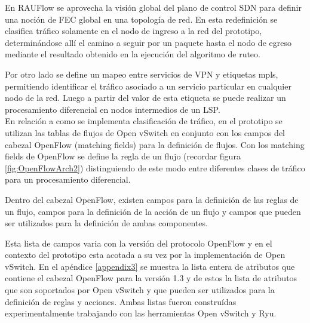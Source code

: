 En RAUFlow se aprovecha la visi\'on global del plano de control SDN para definir una noci\'on de FEC global en una topolog\'ia de red. En esta redefinici\'on se clasifica tr\'afico solamente en el nodo de ingreso a la red del prototipo, determinándose all\'i el camino a seguir por un paquete hasta el nodo de egreso mediante el resultado obtenido en la ejecuci\'on del algoritmo de ruteo. 


Por otro lado se define un mapeo entre servicios de VPN y etiquetas mpls, permitiendo identificar el tr\'afico asociado a un servicio particular en cualquier nodo de la red. Luego a partir del valor de esta etiqueta se puede realizar un procesamiento diferencial en nodos intermedios de un LSP.\\


En relaci\'on a como se implementa clasificaci\'on de tr\'afico, en el prototipo se utilizan las tablas de flujos de Open vSwitch en conjunto con los campos del cabezal OpenFlow (matching fields) para la definici\'on de flujos. Con los matching fields de OpenFlow se define la regla de un flujo (recordar figura \ref{fig:OpenFlowArch2}) distinguiendo de este modo entre diferentes clases de tr\'afico para un procesamiento diferencial.

Dentro del cabezal OpenFlow, existen campos para la definici\'on de las reglas de un flujo, campos para la definici\'on de la acci\'on de un flujo y campos que pueden ser utilizados para la definici\'on de ambas componentes.  

Esta lista de campos varia con la versi\'on del protocolo OpenFlow y en el contexto del prototipo esta acotada a su vez por la implementaci\'on de Open vSwitch. En el ap\'endice \ref{appendix3} se muestra  la lista entera de atributos que contiene el cabezal OpenFlow para la versi\'on 1.3 y de estos la lista de atributos que son soportados por Open vSwitch y que pueden ser utilizados para la definici\'on de reglas y acciones. Ambas listas fueron constru\'idas experimentalmente trabajando con las herramientas Open vSwitch y Ryu.\\

